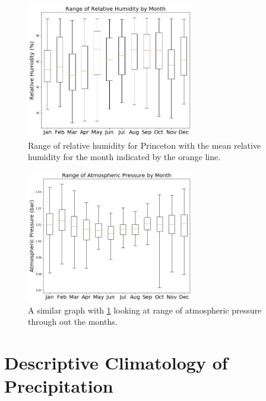 \documentclass[11pt]{report}
\begin{document}
\clearpage
\begin{figure}[t]
	\centering
	\includegraphics[width=0.65\textwidth]{Figures/RH_range.png}
	\caption[Range of Relative Humidity in Princeton (2017- 2021)]{\label{RH_range} Range of relative humidity for Princeton with the mean relative humidity for the month indicated by the orange line.}
\end{figure}
\begin{figure}[b]
	\centering
	\includegraphics[width=0.65\textwidth]{Figures/AP_range.png}
	\caption[Range of Atmospheric Pressure in Princeton (2017- 2021) ]{\label{AP_range}
		A similar graph with \ref{RH_range} looking at range of atmospheric pressure through out the months.  }
\end{figure}
\clearpage
\section{Descriptive Climatology of Precipitation}\label{sec:dcp}
\end{document}
